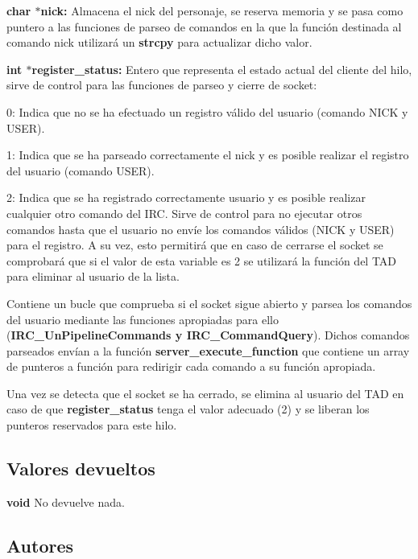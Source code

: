 \begin{DoxyItemize}
\item {\bfseries char $\ast$nick\+:} Almacena el nick del personaje, se reserva memoria y se pasa como puntero a las funciones de parseo de comandos en la que la función destinada al comando nick utilizará un {\bfseries strcpy} para actualizar dicho valor. 
\item {\bfseries int $\ast$register\+\_\+status\+:} Entero que representa el estado actual del cliente del hilo, sirve de control para las funciones de parseo y cierre de socket\+: 
\begin{DoxyItemize}
\item 0\+: Indica que no se ha efectuado un registro válido del usuario (comando N\+I\+CK y U\+S\+ER). 
\item 1\+: Indica que se ha parseado correctamente el nick y es posible realizar el registro del usuario (comando U\+S\+ER). 
\item 2\+: Indica que se ha registrado correctamente usuario y es posible realizar cualquier otro comando del I\+RC. Sirve de control para no ejecutar otros comandos hasta que el usuario no envíe los comandos válidos (N\+I\+CK y U\+S\+ER) para el registro. A su vez, esto permitirá que en caso de cerrarse el socket se comprobará que si el valor de esta variable es 2 se utilizará la función del T\+AD para eliminar al usuario de la lista. 
\end{DoxyItemize}
\end{DoxyItemize}

Contiene un bucle que comprueba si el socket sigue abierto y parsea los comandos del usuario mediante las funciones apropiadas para ello ({\bfseries I\+R\+C\+\_\+\+Un\+Pipeline\+Commands y I\+R\+C\+\_\+\+Command\+Query}). Dichos comandos parseados envían a la función {\bfseries server\+\_\+execute\+\_\+function} que contiene un array de punteros a función para redirigir cada comando a su función apropiada.

Una vez se detecta que el socket se ha cerrado, se elimina al usuario del T\+AD en caso de que {\bfseries register\+\_\+status} tenga el valor adecuado (2) y se liberan los punteros reservados para este hilo.\hypertarget{server_start_communication_return4}{}\subsection{Valores devueltos}\label{server_start_communication_return4}

\begin{DoxyItemize}
\item {\bfseries void} No devuelve nada. 
\end{DoxyItemize}\hypertarget{server_start_communication_authors4}{}\subsection{Autores}\label{server_start_communication_authors4}

